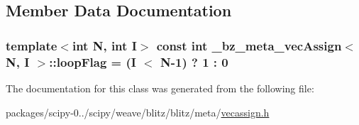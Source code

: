 \subsection{Member Data Documentation}
\hypertarget{class__bz__meta__vecAssign_ade79bd12e82e4cca649309d26b722a74}{}
\subsubsection[{loop\+Flag}]{\setlength{\rightskip}{0pt plus 5cm}template$<$int N, int I$>$ const int {\bf \+\_\+bz\+\_\+meta\+\_\+vec\+Assign}$<$ {\bf N}, I $>$\+::loop\+Flag = (I $<$ {\bf N}-\/1) ? 1 \+: 0\hspace{0.3cm}{\ttfamily [static]}}\label{class__bz__meta__vecAssign_ade79bd12e82e4cca649309d26b722a74}


The documentation for this class was generated from the following file\+:\begin{DoxyCompactItemize}
\item 
packages/scipy-\/0../scipy/weave/blitz/blitz/meta/\hyperlink{vecassign_8h}{vecassign.\+h}\end{DoxyCompactItemize}
